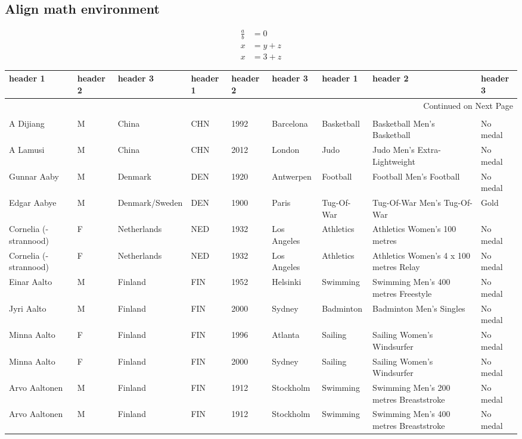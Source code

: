 \documentclass{article}%
\begin{document}
%
\subsection{Align math environment}%
\label{subsec:Alignmathenvironment}%
\begin{align}%
\frac{a}{b} &= 0 \\%
x &= y + z \\%
x &= 3 + z%
\end{align}

%
\begin{longtable}{p{1.5cm} p{0.5cm} p{2cm} p{1cm} p{1cm} p{1.5cm} p{1.5cm} p{5cm} p{1.5cm}}%
\hline%
header 1&header 2&header 3&header 1&header 2&header 3&header 1&header 2&header 3\\%
\hline%
\endhead%
\hline%
\multicolumn{9}{r}{Continued on Next Page}\\%
\hline%
\endfoot%
\hline%
\multicolumn{9}{r}{Not Continued on Next Page}\\%
\hline%
\endlastfoot%
A Dijiang&M&China&CHN&1992&Barcelona&Basketball&Basketball Men's Basketball&No medal\\%
A Lamusi&M&China&CHN&2012&London&Judo&Judo Men's Extra{-}Lightweight&No medal\\%
Gunnar Aaby&M&Denmark&DEN&1920&Antwerpen&Football&Football Men's Football&No medal\\%
Edgar Aabye&M&Denmark/Sweden&DEN&1900&Paris&Tug{-}Of{-}War&Tug{-}Of{-}War Men's Tug{-}Of{-}War&Gold\\%
Cornelia ({-}strannood)&F&Netherlands&NED&1932&Los Angeles&Athletics&Athletics Women's 100 metres&No medal\\%
Cornelia ({-}strannood)&F&Netherlands&NED&1932&Los Angeles&Athletics&Athletics Women's 4 x 100 metres Relay&No medal\\%
Einar Aalto&M&Finland&FIN&1952&Helsinki&Swimming&Swimming Men's 400 metres Freestyle&No medal\\%
Jyri Aalto&M&Finland&FIN&2000&Sydney&Badminton&Badminton Men's Singles&No medal\\%
Minna Aalto&F&Finland&FIN&1996&Atlanta&Sailing&Sailing Women's Windsurfer&No medal\\%
Minna Aalto&F&Finland&FIN&2000&Sydney&Sailing&Sailing Women's Windsurfer&No medal\\%
Arvo Aaltonen&M&Finland&FIN&1912&Stockholm&Swimming&Swimming Men's 200 metres Breaststroke&No medal\\%
Arvo Aaltonen&M&Finland&FIN&1912&Stockholm&Swimming&Swimming Men's 400 metres Breaststroke&No medal\\%

\end{longtable}
\end{document}
